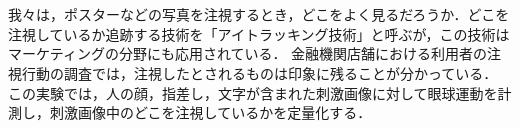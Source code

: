 \chapter{\kadaid}
\section{\purpose}
我々は，ポスターなどの写真を注視するとき，どこをよく見るだろうか．どこを注視しているか追跡する技術を「アイトラッキング技術」と呼ぶが，この技術はマーケティングの分野にも応用されている．
金融機関店舗における利用者の注視行動の調査\cite{アイトラッキング技術を用いた地域実践的研究の報告}では，注視したとされるものは印象に残ることが分かっている．
この実験では，人の顔，指差し，文字が含まれた刺激画像に対して眼球運動を計測し，刺激画像中のどこを注視しているかを定量化する．
\section{\method}
